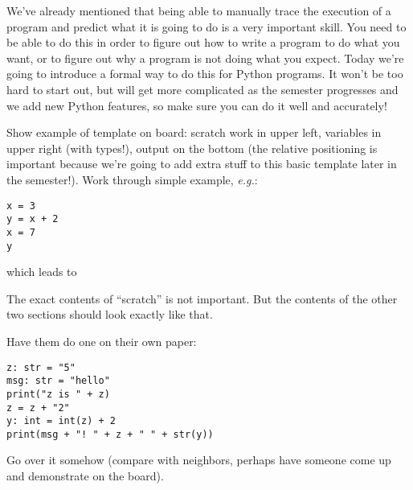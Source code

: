 \documentclass{article}
\newcommand{\eg}{\emph{e.g.}\xspace}
\begin{document}
We've already mentioned that being able to manually trace the
execution of a program and predict what it is going to do is a very
important skill.  You need to be able to do this in order to figure
out how to write a program to do what you want, or to figure out why a
program is not doing what you expect.  Today we're going to introduce
a formal way to do this for Python programs.  It won't be too hard to
start out, but will get more complicated as the semester progresses
and we add new Python features, so make sure you can do it well and
accurately!

Show example of template on board: scratch work in upper left,
variables in upper right (with types!), output on the bottom (the
relative positioning is important because we're going to add extra
stuff to this basic template later in the semester!).  Work through
simple example, \eg:
\begin{verbatim}
x = 3
y = x + 2
x = 7
y
\end{verbatim}
which leads to \bigskip

 \bigskip

The exact contents of ``scratch'' is not important.  But the contents
of the other two sections should look exactly like that.

Have them do one on their own paper:

\begin{verbatim}
z: str = "5"
msg: str = "hello"
print("z is " + z)
z = z + "2"
y: int = int(z) + 2
print(msg + "! " + z + " " + str(y))
\end{verbatim}

Go over it somehow (compare with neighbors, perhaps have someone come
up and demonstrate on the board).
\end{document}
